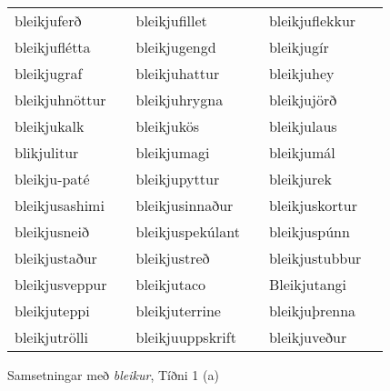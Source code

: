 \documentclass[../samsetningasafn.tex]{subfiles}
\begin{document}
\begin{wordlist}[H]
\begin{tcolorbox}
\begin{tabular}{BlBlBl}
		bleikjuferð		&		& 
		bleikjufillet		&		& 
		bleikjuflekkur		&		\\  %
		bleikjuflétta		&		& 
		bleikjugengd		&		& 
		bleikjugír		&		\\   %
		bleikjugraf		&		& 
		bleikjuhattur		&		& 
		bleikjuhey		&		\\  %
		bleikjuhnöttur	&		& 
		bleikjuhrygna	&		& 
		bleikjujörð		&		\\  %
		bleikjukalk		&		& 
		bleikjukös		&		& 
		bleikjulaus		&		\\  %
		blikjulitur		&		& 
		bleikjumagi		&		& 
		bleikjumál		&		\\  %
		bleikju-paté		&		& 
		bleikjupyttur		&		& 
		bleikjurek		&		\\  %
		bleikjusashimi	&		& 
		bleikjusinnaður 	&		& 
		bleikjuskortur	&		\\  %
		bleikjusneið		&		& 
		bleikjuspekúlant	&		& 
		bleikjuspúnn		&		\\  %
		bleikjustaður		&		& 
		bleikjustreð		&		& 
		bleikjustubbur	&		\\  %
		bleikjusveppur	&		& 
		bleikjutaco		&		& 
		Bleikjutangi		&		\\  %
		bleikjuteppi		&		& 
		bleikjuterrine		&		& 
		bleikjuþrenna	&		\\  %
		bleikjutrölli		&		& 
		bleikjuuppskrift	&		& 
		bleikjuveður		&		 	 %
	\end{tabular}

\end{tcolorbox}
	\caption{Samsetningar með \textit{bleikur}, Tíðni 1 (a)}
	\label{listi:bleikt.1a}
\end{wordlist}	
	
\end{document}
